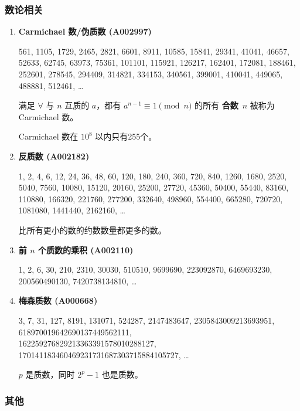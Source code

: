 \documentclass[a4paper, twoside]{article}
\begin{document}
        \subsubsection{数论相关}

        \begin{enumerate}
        
        \item \textbf{Carmichael 数/伪质数 (A002997)}
        
        561, 1105, 1729, 2465, 2821, 6601, 8911, 10585, 15841, 29341, 41041, 46657, 52633, 62745, 63973, 75361, 101101, 115921, 126217, 162401, 172081, 188461, 252601, 278545, 294409, 314821, 334153, 340561, 399001, 410041, 449065, 488881, 512461, \dots
        
        满足 $\forall$ 与 $n$ 互质的 $a$，都有 $a ^ {n - 1} \equiv 1 \pmod n$ 的所有 \textbf{合数}\ $n$ 被称为 Carmichael 数。
        
        Carmichael 数在 $10^8$ 以内只有255个。
        
        \item \textbf{反质数 (A002182)}
        
        1, 2, 4, 6, 12, 24, 36, 48, 60, 120, 180, 240, 360, 720, 840, 1260, 1680, 2520, 5040, 7560, 10080, 15120, 20160, 25200, 27720, 45360, 50400, 55440, 83160, 110880, 166320, 221760, 277200, 332640, 498960, 554400, 665280, 720720, 1081080, 1441440, 2162160, \dots
        
        比所有更小的数的约数数量都更多的数。
        
        \item \textbf{前 $n$ 个质数的乘积 (A002110)}
        
        1, 2, 6, 30, 210, 2310, 30030, 510510, 9699690, 223092870, 6469693230, 200560490130, 7420738134810, \dots
        
        \item \textbf{梅森质数 (A000668)}
        
        3, 7, 31, 127, 8191, 131071, 524287, 2147483647, 2305843009213693951, 618970019642690137449562111, \\
         162259276829213363391578010288127, 170141183460469231731687303715884105727, \dots
        
        $p$ 是质数，同时 $2^p - 1$ 也是质数。
        
        \end{enumerate}

        \subsubsection{其他}
\end{document}
